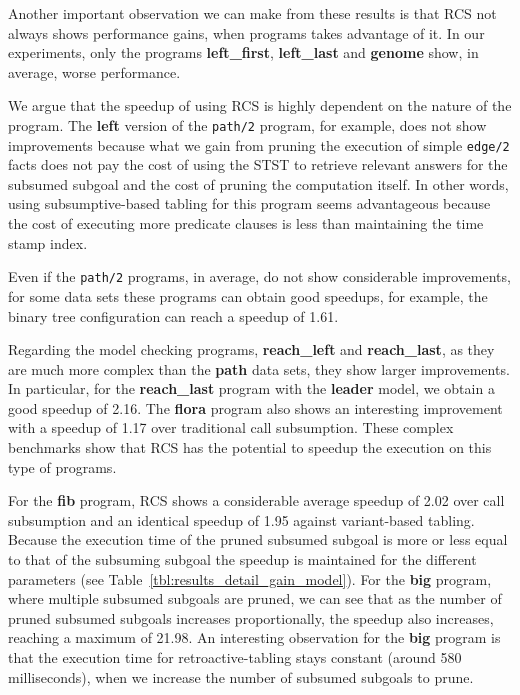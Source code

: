 

Another important observation we can make from these results is that RCS not always shows performance gains, when
programs takes advantage of it. In our experiments, only the programs \textbf{left\_first}, \textbf{left\_last} and
\textbf{genome} show, in average, worse performance.


We argue that the speedup of using RCS is highly dependent on the nature of the program. The \textbf{left} version
of the \texttt{path/2} program, for example, does not show improvements because what we gain from pruning the
execution of simple \texttt{edge/2} facts does not pay the cost of using the STST to retrieve relevant answers
for the subsumed subgoal and the cost of pruning the computation itself. In other words, using subsumptive-based
tabling for this program seems advantageous because the cost of executing more predicate clauses is less than
maintaining the time stamp index.

Even if the \texttt{path/2} programs, in average, do not show considerable improvements, for some data sets these
programs can obtain good speedups, for example, the binary tree configuration can reach a speedup of 1.61.




Regarding the model checking programs, \textbf{reach\_left} and \textbf{reach\_last}, as they are much more complex
than the \textbf{path} data sets, they show larger improvements. In particular, for the \textbf{reach\_last} program
with the \textbf{leader} model, we obtain a good speedup of 2.16. The \textbf{flora} program also shows an interesting
improvement with a speedup of 1.17 over traditional call subsumption. These complex benchmarks show that RCS has the
potential to speedup the execution on this type of programs.

For the \textbf{fib} program, RCS shows a considerable average speedup of 2.02 over call subsumption and an identical
speedup of 1.95 against variant-based tabling. Because the execution time of the pruned subsumed subgoal is more or less
equal to that of the subsuming subgoal the speedup is maintained for the different parameters (see 
Table~\ref{tbl:results_detail_gain_model}). For the \textbf{big} program, where multiple subsumed subgoals are
pruned, we can see that as the number of pruned subsumed subgoals increases proportionally, the speedup also increases,
reaching a maximum of 21.98. An interesting observation for the \textbf{big} program is that the execution time for
retroactive-tabling stays constant (around 580 milliseconds), when we increase the number of subsumed subgoals to prune.


